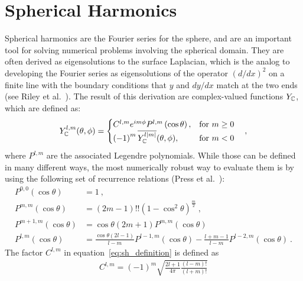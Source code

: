 \section{Spherical Harmonics}
\label{sec:sh}

Spherical harmonics are the Fourier series for the sphere, and are an important tool for solving numerical problems involving the spherical domain. They are often derived as eigensolutions to the surface Laplacian, which is the analog to developing the Fourier series as eigensolutions of the operator $(d/dx)^2$ on a finite line with the boundary conditions that $y$ and $dy/dx$ match at the two ends (see Riley et al.~\cite{Riley2006}). The result of this derivation are complex-valued functions $Y_{\mathbb{C}}$, which are defined as:
\begin{align}
\label{eq:sh_definition}
Y_{\mathbb{C}}^{l,m}(\theta, \phi)=
\begin{cases}
C^{l,m}e^{im\phi}P^{l,m}\left(\operatorname{cos}\theta\right), & \text{for $m\ge0$}\\
\left(-1\right)^m\overline{Y_{\mathbb{C}}^{l\left|m\right|}}(\theta, \phi), & \text{for $m<0$}
\end{cases}
\quad ,
\end{align}
where $P^{l,m}$ are the associated Legendre polynomials. While those can be defined in many different ways, the most numerically robust way to evaluate them is by using the following set of recurrence relations (Press et al.~\cite{Press07}):
\begin{align}
P^{0,0}\left(\operatorname{cos}\theta\right) &=
1
\  ,
\nonumber
\\
P^{m,m}\left(\operatorname{cos}\theta\right) &=
\left(2m-1\right)!!\left(1-\operatorname{cos}^2\theta\right)^\frac{m}{2}
\  ,
\nonumber
\\
P^{m+1,m}\left(\operatorname{cos}\theta\right) &=
\operatorname{cos}\theta\left(2m+1\right)P^{m,m}\left(\operatorname{cos}\theta\right)
\ 
\nonumber
\\
P^{l,m}\left(\operatorname{cos}\theta\right) &=
\frac{\operatorname{cos}\theta\left(2l-1\right)}{l-m}
P^{l-1,m}\left(\operatorname{cos}\theta\right)
-
\frac{l+m-1}{l-m}
P^{l-2,m}\left(\operatorname{cos}\theta\right)
\  .
\label{eq:sh_Plm}
\end{align}
The factor $C^{l,m}$ in equation~\ref{eq:sh_definition} is defined as
\begin{align}
\label{eq:sh_definition_C}
C^{l,m}=(-1)^m\sqrt{\frac{2l+1}{4\pi}\frac{(l-m)!}{(l+m)!}}
\end{align}
